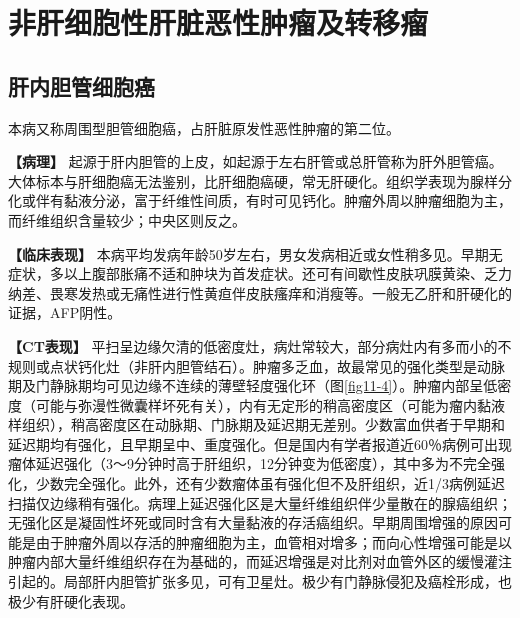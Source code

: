 \section{非肝细胞性肝脏恶性肿瘤及转移瘤}

\subsection{肝内胆管细胞癌}

本病又称周围型胆管细胞癌，占肝脏原发性恶性肿瘤的第二位。

\textbf{【病理】}
起源于肝内胆管的上皮，如起源于左右肝管或总肝管称为肝外胆管癌。大体标本与肝细胞癌无法鉴别，比肝细胞癌硬，常无肝硬化。组织学表现为腺样分化或伴有黏液分泌，富于纤维性间质，有时可见钙化。肿瘤外周以肿瘤细胞为主，而纤维组织含量较少；中央区则反之。

\textbf{【临床表现】}
本病平均发病年龄50岁左右，男女发病相近或女性稍多见。早期无症状，多以上腹部胀痛不适和肿块为首发症状。还可有间歇性皮肤巩膜黄染、乏力纳差、畏寒发热或无痛性进行性黄疸伴皮肤瘙痒和消瘦等。一般无乙肝和肝硬化的证据，AFP阴性。

\textbf{【CT表现】}
平扫呈边缘欠清的低密度灶，病灶常较大，部分病灶内有多而小的不规则或点状钙化灶（非肝内胆管结石）。肿瘤多乏血，故最常见的强化类型是动脉期及门静脉期均可见边缘不连续的薄壁轻度强化环（图\ref{fig11-4}）。肿瘤内部呈低密度（可能与弥漫性微囊样坏死有关），内有无定形的稍高密度区（可能为瘤内黏液样组织），稍高密度区在动脉期、门脉期及延迟期无差别。少数富血供者于早期和延迟期均有强化，且早期呈中、重度强化。但是国内有学者报道近60％病例可出现瘤体延迟强化（3～9分钟时高于肝组织，12分钟变为低密度），其中多为不完全强化，少数完全强化。此外，还有少数瘤体虽有强化但不及肝组织，近1/3病例延迟扫描仅边缘稍有强化。病理上延迟强化区是大量纤维组织伴少量散在的腺癌组织；无强化区是凝固性坏死或同时含有大量黏液的存活癌组织。早期周围增强的原因可能是由于肿瘤外周以存活的肿瘤细胞为主，血管相对增多；而向心性增强可能是以肿瘤内部大量纤维组织存在为基础的，而延迟增强是对比剂对血管外区的缓慢灌注引起的。局部肝内胆管扩张多见，可有卫星灶。极少有门静脉侵犯及癌栓形成，也极少有肝硬化表现。

